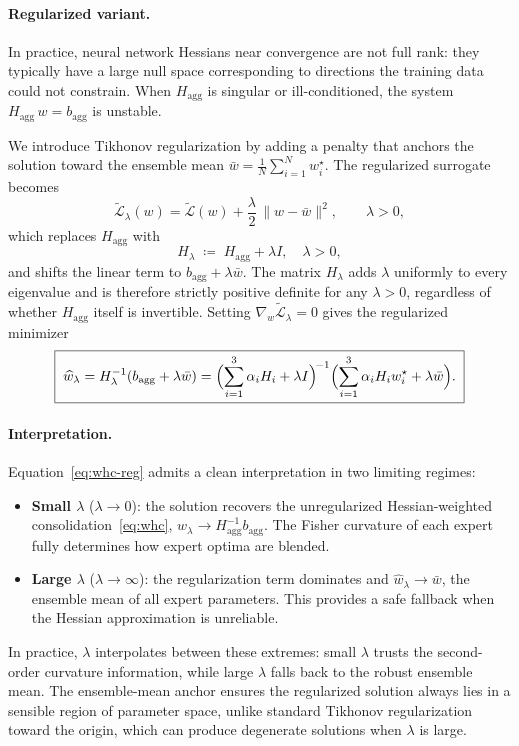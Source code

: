 \documentclass[11pt]{article}
\begin{document}
\paragraph{Regularized variant.}
In practice, neural network Hessians near convergence are not full rank: they typically
have a large null space corresponding to directions the training data could not
constrain. When $H_{\mathrm{agg}}$ is singular or ill-conditioned, the system
$H_{\mathrm{agg}}\,w = b_{\mathrm{agg}}$ is unstable.

We introduce Tikhonov regularization by adding a penalty that anchors the solution
toward the ensemble mean $\bar{w} = \frac{1}{N}\sum_{i=1}^{N} w_i^\star$. The
regularized surrogate becomes
\begin{equation}
  \widetilde{\mathcal{L}}_\lambda(w)
    = \widetilde{\mathcal{L}}(w)
    + \frac{\lambda}{2}\,\|w - \bar{w}\|^2, \qquad \lambda > 0,
  \label{eq:regularized-surrogate}
\end{equation}
which replaces $H_{\mathrm{agg}}$ with
\[
  H_\lambda \;\coloneqq\; H_{\mathrm{agg}} + \lambda I, \quad \lambda > 0,
\]
and shifts the linear term to $b_{\mathrm{agg}} + \lambda\bar{w}$.
The matrix $H_\lambda$ adds $\lambda$ uniformly to every eigenvalue and is therefore
strictly positive definite for any $\lambda > 0$, regardless of whether
$H_{\mathrm{agg}}$ itself is invertible. Setting $\nabla_w \widetilde{\mathcal{L}}_\lambda = 0$
gives the regularized minimizer
\begin{equation}
  \boxed{\;\widehat w_\lambda
    = H_\lambda^{-1}(b_{\mathrm{agg}} + \lambda\bar{w})
    = \Bigl(\sum_{i=1}^{3}\alpha_i H_i + \lambda I\Bigr)^{\!-1}
      \Bigl(\sum_{i=1}^{3}\alpha_i H_i w_i^\star + \lambda\bar{w}\Bigr).\;}
  \label{eq:whc-reg}
\end{equation}

\paragraph{Interpretation.}
Equation~\eqref{eq:whc-reg} admits a clean interpretation in two limiting regimes:
\begin{itemize}
  \item \textbf{Small $\lambda$} ($\lambda \to 0$): the solution recovers the
    unregularized Hessian-weighted consolidation~\eqref{eq:whc}, $\widehat w_\lambda
    \to H_{\mathrm{agg}}^{-1} b_{\mathrm{agg}}$. The Fisher curvature of each expert
    fully determines how expert optima are blended.
  \item \textbf{Large $\lambda$} ($\lambda \to \infty$): the regularization term
    dominates and $\widehat w_\lambda \to \bar{w}$, the ensemble mean of all expert
    parameters. This provides a safe fallback when the Hessian approximation is
    unreliable.
\end{itemize}
In practice, $\lambda$ interpolates between these extremes: small $\lambda$ trusts the
second-order curvature information, while large $\lambda$ falls back to the robust
ensemble mean. The ensemble-mean anchor ensures the regularized solution always lies in
a sensible region of parameter space, unlike standard Tikhonov regularization toward
the origin, which can produce degenerate solutions when $\lambda$ is large.
\end{document}
